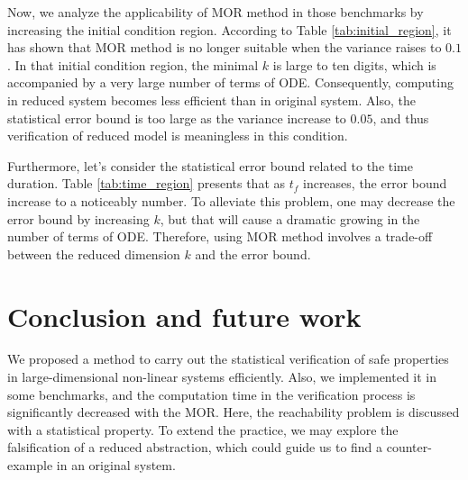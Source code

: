 \documentclass[runningheads,a4paper]{llncs}
\theoremstyle{definition}
\theoremstyle{plain}
\begin{document}
Now, we analyze the applicability of MOR method in those benchmarks by increasing the initial condition region. According to Table \ref{tab:initial_region}, it has shown that MOR method is no longer suitable when the variance raises to $0.1$. In that initial condition region, the minimal $k$ is large to ten digits, which is accompanied by a very large number of terms of ODE. Consequently, computing in reduced system becomes less efficient than in original system. Also, the statistical error bound is too large as the variance increase to $0.05$, and thus verification of reduced model is meaningless in this condition.

Furthermore, let's consider the statistical error bound related to the time duration. Table \ref{tab:time_region} presents that as  $t_f$ increases, the error bound increase to a noticeably number. To alleviate this problem, one may decrease the error bound by increasing $k$, but that will cause a dramatic growing in the number of terms of ODE. Therefore, using MOR method involves a trade-off between the reduced dimension $k$ and the error bound.

\section{Conclusion and future work}  \label{conclusion}
We proposed a method to carry out the statistical verification of safe properties in large-dimensional non-linear systems efficiently. Also, we implemented it in some benchmarks, and the computation time in the verification process is significantly decreased with the MOR. Here, the reachability problem is discussed with a statistical property. To extend the practice, we may explore the falsification of a reduced abstraction, which could guide us to find a counter-example in an original system.


\end{document}
